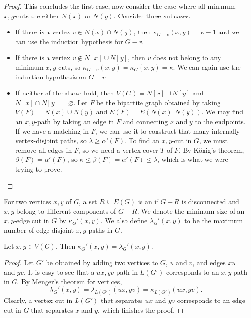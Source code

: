 \begin{proof}
  This concludes the first case, now consider the case where all minimum
  $x,y$-cuts are either $N(x)$ or $N(y)$.
  Consider three subcases.
  \begin{itemize}
  \item If there is a vertex $v \in N(x) \cap N(y)$, then $\kappa_{G - v}(x,y) =
	\kappa-1$ and we can use the induction hypothesis for $G-v$.
  \item If there is a vertex $v \notin N[x] \cup N[y]$, then $v$ does not belong
	to any minimum $x,y$-cuts, so $\kappa_{G-v}(x,y) = \kappa_G(x,y) = \kappa$.
	We can again use the induction hypothesis on $G-v$.
  \item If neither of the above hold, then $V(G) = N[x] \cup N[y]$ and $N[x]
	\cap N[y] = \varnothing$.
	Let $F$ be the bipartite graph obtained by taking $V(F) = N(x) \cup N(y)$
	and $E(F) = E(N(x), N(y))$.
	We may find an $x,y$-path by taking an edge in $F$ and connecting $x$ and
	$y$ to the endpoints.
	If we have a matching in $F$, we can use it to construct that many
	internally vertex-disjoint paths, so $\lambda \ge \alpha'(F)$.
	To find an $x,y$-cut in $G$, we must remove all edges in $F$, so we need a
	vertex cover $T$ of $F$.
	By König's theorem, $\beta(F) = \alpha'(F)$, so $\kappa \le \beta(F) =
	\alpha'(F) \le \lambda$, which is what we were trying to prove.
	\qedhere
  \end{itemize}
\end{proof}

\begin{definition}
  For two vertices $x,y$ of $G$, a set $R \subseteq E(G)$ is an
   if $G-R$ is disconnected and $x,y$ belong to different
  components of $G-R$.
  We denote the minimum size of an $x,y$-edge cut in $G$ by $\kappa_G'(x,y)$.
  We also define $\lambda_G'(x,y)$ to be the maximum number of edge-disjoint
  $x,y$-paths in $G$.
\end{definition}

\begin{theorem}
  Let $x,y \in V(G)$.
  Then $\kappa_G'(x,y) = \lambda_G'(x,y)$.
\end{theorem}

\begin{proof}
  Let $G'$ be obtained by adding two vertices to $G$, $u$ and $v$, and edges
  $xu$ and $yv$.
  It is easy to see that a $ux,yv$-path in $L(G')$ corresponds to an $x,y$-path
  in $G$.
  By Menger's theorem for vertices,
  \[
	\lambda_G'(x,y) = \lambda_{L(G')}(ux,yv) = \kappa_{L(G')}(ux,yv).
  \]
  Clearly, a vertex cut in $L(G')$ that separates $ux$ and $yv$ corresponds to
  an edge cut in $G$ that separates $x$ and $y$, which finishes the proof.
\end{proof}

